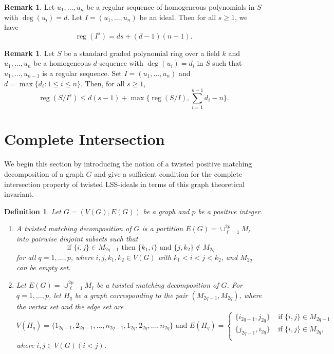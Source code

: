 \documentclass[11pt,a4paper,reqno]{amsart}
\newtheorem{definition}[thm]{Definition}
\theoremstyle{definition}
\newtheorem{remark}[thm]{Remark}
\numberwithin{equation}{section}
\DeclareMathOperator{\reg}{reg}
\begin{document}
\begin{remark}\cite[Lemma 4.4]{BHT15} \label{regular}
    Let $u_1,\ldots,u_n$ be a regular sequence of homogeneous polynomials in $S$ with $\deg(u_i)=d$. Let $I= (u_1,\ldots,u_n)$ be an ideal. Then for all $s \geq 1$, we have 
    $$\reg(I^s)=ds+(d-1)(n-1).$$
\end{remark}

\begin{remark} \cite[Corollary 2.11]{JAR2019} \label{Reg.upper}
     Let $S$ be a standard graded polynomial ring over a field $k$ and $u_1,\ldots,u_n$ be a homogeneous $d$-sequence with $\deg(u_i)= d_i$ in $S$ such that $u_1,\ldots, u_{n-1}$ is a regular sequence. Set $I=(u_1,\ldots,u_n)$ and $d=\max\{d_i : 1 \leq i \leq n\}.$ Then, for all $s \geq 1$, 
    $$\reg(S/I^s) \leq d(s-1) + \max\{\reg(S/I),\sum_{i=1}^{n-1}d_i-n\}.$$
\end{remark}



 
\section{Complete Intersection} \label{section 2}

We begin this section by introducing the notion of a twisted positive matching decomposition of a graph $G$ and give a sufficient condition for the complete intersection property of twisted LSS-ideals in terms of this graph theoretical invariant.

\vspace{2mm}

\begin{definition} \label{def.tmd}
    Let $G=(V(G),E(G))$ be a graph and $p$ be a positive integer. 
    \begin{enumerate}
        \item[(a)] A twisted matching decomposition of $G$ is a partition $E(G)=\cup_{\ell=1}^{2p}M_\ell$ into pairwise disjoint subsets such that 
\begin{equation} \label{eq.matchcond}
    \text{ if } \{i,j\}\in M_{2q-1} \text{ then } \{k_1,i\} \text{ and } \{j,k_2\} \notin M_{2q}
\end{equation} 
for all $q=1,\ldots,p$, where $i,j,k_1,k_2 \in V(G)$ with $k_1<i<j<k_2$, and $M_{2q}$ can be empty set.
\item[(b)] Let $E(G)=\cup_{\ell=1}^{2p}M_\ell$ be a twisted matching decomposition of $G$. For $q=1,\ldots,p$,  let $H_q$ be a graph corresponding to the pair $(M_{2q-1},M_{2q})$, where the vertex set and the edge set are 
$$V(H_q)=\{1_{2q-1},2_{2q-1},\ldots,n_{2q-1},1_{2q},2_{2q},\ldots,n_{2q}\} \text{ and }
E(H_q)=\begin{cases}
    \{i_{2q-1},j_{2q}\} & \text{ if } \{i,j\}\in M_{2q-1}\\
    \{j_{2q-1},i_{2q}\} & \text{ if } \{i,j\}\in M_{2q},\\
\end{cases}$$
where $i,j \in V(G)(i<j)$.
    \end{enumerate} 
\end{definition}
\end{document}
